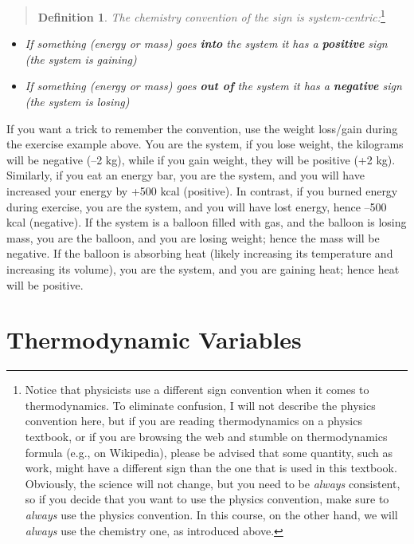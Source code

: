 \documentclass[
  9pt,
]{extbook}
\providecommand{\tightlist}{%
  \setlength{\itemsep}{0pt}\setlength{\parskip}{0pt}}
\theoremstyle{definition}
\newtheorem{definition}{Definition}[chapter]
\theoremstyle{definition}
\theoremstyle{definition}
\theoremstyle{definition}
\theoremstyle{remark}
\begin{document}
\begin{quote}
\begin{definition}
\protect\hypertarget{def:chemistryconv}{}\label{def:chemistryconv}\emph{The chemistry convention of the sign is system-centric:}\footnote{Notice that physicists use a different sign convention when it comes to thermodynamics. To eliminate confusion, I will not describe the physics convention here, but if you are reading thermodynamics on a physics textbook, or if you are browsing the web and stumble on thermodynamics formula (e.g., on Wikipedia), please be advised that some quantity, such as work, might have a different sign than the one that is used in this textbook. Obviously, the science will not change, but you need to be \emph{always} consistent, so if you decide that you want to use the physics convention, make sure to \emph{always} use the physics convention. In this course, on the other hand, we will \emph{always} use the chemistry one, as introduced above.}
\end{definition}
\end{quote}

\begin{itemize}
\tightlist
\item
  \emph{If something (energy or mass) goes \textbf{into} the system it has a \textbf{positive} sign (the system is gaining)}
\item
  \emph{If something (energy or mass) goes \textbf{out of} the system it has a \textbf{negative} sign (the system is losing)}
\end{itemize}

If you want a trick to remember the convention, use the weight loss/gain during the exercise example above. You are the system, if you lose weight, the kilograms will be negative (--2 kg), while if you gain weight, they will be positive (+2 kg). Similarly, if you eat an energy bar, you are the system, and you will have increased your energy by +500 kcal (positive). In contrast, if you burned energy during exercise, you are the system, and you will have lost energy, hence --500 kcal (negative). If the system is a balloon filled with gas, and the balloon is losing mass, you are the balloon, and you are losing weight; hence the mass will be negative. If the balloon is absorbing heat (likely increasing its temperature and increasing its volume), you are the system, and you are gaining heat; hence heat will be positive.

\section{Thermodynamic Variables}\label{thermodynamic-variables}
\end{document}
